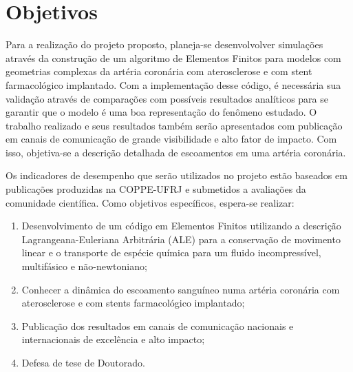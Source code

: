 \section{Objetivos}

Para a realização do projeto proposto, planeja-se desenvolvolver simulações através da construção de um algoritmo de Elementos Finitos para modelos com geometrias complexas da artéria coronária com aterosclerose e com stent farmacológico implantado. 
Com a implementação desse código, é necessária sua validação através de comparações com possíveis resultados analíticos para se garantir que o modelo é uma boa representação do fenômeno estudado. 
O trabalho realizado e seus resultados também serão apresentados com publicação em canais de comunicação de grande visibilidade e alto fator de impacto. 
Com isso, objetiva-se a descrição detalhada de escoamentos em uma artéria coronária.

\bigskip
Os indicadores de desempenho que serão utilizados no projeto estão baseados em publicações produzidas na COPPE-UFRJ e 
submetidos a avaliações da comunidade científica. 
Como objetivos específicos, espera-se realizar:

\begin{enumerate}
\item Desenvolvimento de um código em Elementos Finitos utilizando a descrição Lagrangeana-Euleriana Arbitrária (ALE) para a conservação de movimento linear e o transporte de espécie química para um fluido incompressível, multifásico e não-newtoniano;

\item Conhecer a dinâmica do escoamento sanguíneo numa artéria coronária com aterosclerose
e com stents farmacológico implantado;

\item Publicação dos resultados em canais de comunicação nacionais e internacionais de excelência e alto impacto;

\item Defesa de tese de Doutorado.

\end{enumerate}
